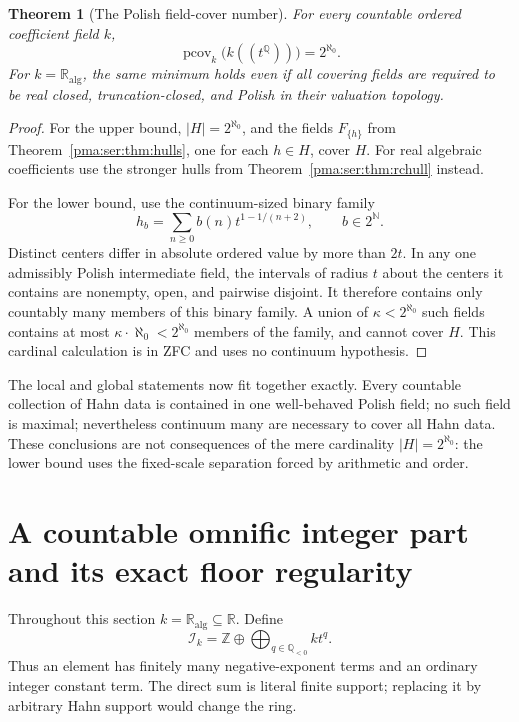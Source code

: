 \documentclass[11pt]{article}
\numberwithin{equation}{section}
\newtheorem{theorem}{Theorem}[section]
\theoremstyle{definition}
\theoremstyle{remark}
\newcommand{\N}{\mathbb N}
\newcommand{\Z}{\mathbb Z}
\newcommand{\Q}{\mathbb Q}
\newcommand{\R}{\mathbb R}
\newcommand{\ka}{\mathbb R_{\mathrm{alg}}}
\newcommand{\Ik}{\mathcal I_k}
\begin{document}
\begin{theorem}[The Polish field-cover number]\label{pma:ser:thm:covernumber}
For every countable ordered coefficient field $k$,
\[
 \operatorname{pcov}_k\bigl(k((t^\Q))\bigr)=2^{\aleph_0}.
\]
For $k=\ka$, the same minimum holds even if all covering fields are required
to be real closed, truncation-closed, and Polish in their valuation topology.
\end{theorem}
\begin{proof}
For the upper bound, $|H|=2^{\aleph_0}$, and the fields $F_{\{h\}}$ from
Theorem~\ref{pma:ser:thm:hulls}, one for each $h\in H$, cover $H$.
For real algebraic coefficients use the stronger hulls from
Theorem~\ref{pma:ser:thm:rchull} instead.

For the lower bound, use the continuum-sized binary family
\[
 h_b=\sum_{n\geq0}b(n)t^{1-1/(n+2)},\qquad b\in2^\N.
\]
Distinct centers differ in absolute ordered value by more than $2t$.
In any one admissibly Polish intermediate field, the intervals of radius
$t$ about the centers it contains are nonempty, open, and pairwise disjoint.
It therefore contains only countably many members of this binary family.
A union of $\kappa<2^{\aleph_0}$ such fields contains at most
$\kappa\cdot\aleph_0<2^{\aleph_0}$ members of the family, and cannot cover
$H$. This cardinal calculation is in ZFC and uses no continuum hypothesis.
\end{proof}

The local and global statements now fit together exactly. Every countable
collection of Hahn data is contained in one well-behaved Polish field;
no such field is maximal; nevertheless continuum many are necessary to
cover all Hahn data. These conclusions are not consequences of the mere
cardinality $|H|=2^{\aleph_0}$: the lower bound uses the fixed-scale
separation forced by arithmetic and order.

\section{A countable omnific integer part and its exact floor regularity}
\label{pma:ser:sec:floor}

Throughout this section $k=\ka\subseteq\R$. Define
\begin{equation}\label{pma:ser:eq:integerpart}
 \Ik=\Z\oplus\bigoplus_{q\in\Q_{<0}}kt^q.
\end{equation}
Thus an element has finitely many negative-exponent terms and an ordinary
integer constant term. The direct sum is literal finite support; replacing it
by arbitrary Hahn support would change the ring.
\end{document}
